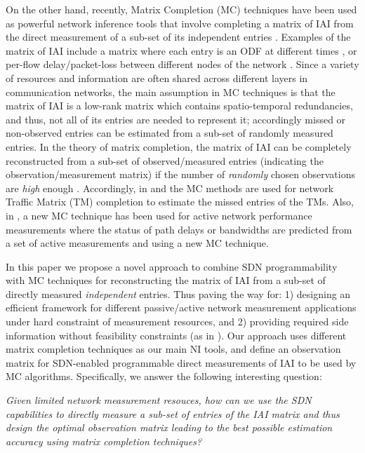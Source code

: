 On the other hand, recently, Matrix Completion (MC) techniques have
been used as powerful network inference tools that involve completing
a matrix of IAI from the direct measurement of a sub-set of its
independent entries
\cite{Roughan:2012}\cite{Gursun:2011}\cite{YLiao:2011}. Examples of
the matrix of IAI include a matrix where each entry is an ODF at
different times \cite{Roughan:2012}, or per-flow delay/packet-loss
between different nodes of the network \cite{YLiao:2011}. Since a
variety of resources and information are often shared across different
layers in communication networks, the main assumption in MC techniques
is that the matrix of IAI is a low-rank matrix which contains
spatio-temporal redundancies, and thus, not all of its entries are
needed to represent it; accordingly missed or non-observed entries can
be estimated from a sub-set of randomly measured entries. In the
theory of matrix completion, the matrix of IAI can be completely
reconstructed from a sub-set of observed/measured entries (indicating
the observation/measurement matrix) if the number of \emph{randomly}
chosen observations are \emph{high} enough
\cite{Candes:2009}\cite{Candes:2010}. Accordingly, in
\cite{Roughan:2012} and \cite{Gursun:2011} the MC methods are used for
network Traffic Matrix (TM) completion to estimate the missed entries
of the TMs. Also, in \cite{YLiao:2011}, a new MC technique has been
used for active network performance measurements where the status of
path delays or bandwidths are predicted from a set of active
measurements and using a new MC technique.

In this paper we propose a novel approach to combine SDN
programmability with MC techniques for reconstructing the matrix of
IAI from a sub-set of directly measured \emph{independent}
entries. Thus paving the way for: 1) designing an efficient framework
for different passive/active network measurement applications under
hard constraint of measurement resources, and 2) providing required
side information without feasibility constraints (as in
\cite{IF14iSTAMP:2014}). Our approach uses different matrix completion
techniques as our main NI tools, and define an observation matrix for
SDN-enabled programmable direct measurements of IAI to be used by MC
algorithms. Specifically, we answer the following interesting
question:

\emph{Given limited network measurement resouces, how can we use the SDN capabilities to directly measure a sub-set of entries of the IAI matrix and thus design the optimal observation matrix leading to the best possible estimation accuracy using matrix completion techniques?}

